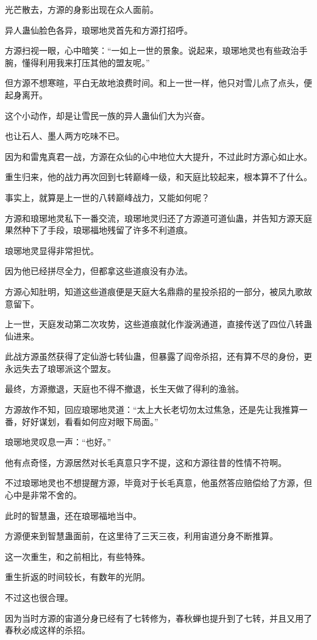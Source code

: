 \begin{this_body}
光芒散去，方源的身影出现在众人面前。

异人蛊仙脸色各异，琅琊地灵首先和方源打招呼。

方源扫视一眼，心中暗笑：“一如上一世的景象。说起来，琅琊地灵也有些政治手腕，懂得利用我来打压其他的盟友呢。”

但方源不想寒暄，平白无故地浪费时间。和上一世一样，他只对雪儿点了点头，便起身离开。

这个小动作，却是让雪民一族的异人蛊仙们大为兴奋。

也让石人、墨人两方吃味不已。

因为和雷鬼真君一战，方源在众仙的心中地位大大提升，不过此时方源心如止水。

重生归来，他的战力再次回到七转巅峰一级，和天庭比较起来，根本算不了什么。

事实上，就算是上一世的八转巅峰战力，又能如何呢？

方源和琅琊地灵私下一番交流，琅琊地灵归还了方源道可道仙蛊，并告知方源天庭果然种下了手段，琅琊福地残留了许多不利道痕。

琅琊地灵显得非常担忧。

因为他已经拼尽全力，但都拿这些道痕没有办法。

方源心知肚明，知道这些道痕便是天庭大名鼎鼎的星投杀招的一部分，被凤九歌故意留下。

上一世，天庭发动第二次攻势，这些道痕就化作漩涡通道，直接传送了四位八转蛊仙进来。

此战方源虽然获得了定仙游七转仙蛊，但暴露了阎帝杀招，还有算不尽的身份，更永远失去了琅琊派这个盟友。

最终，方源撤退，天庭也不得不撤退，长生天做了得利的渔翁。

方源故作不知，回应琅琊地灵道：“太上大长老切勿太过焦急，还是先让我推算一番，好好谋划，看看如何应对眼下局面。”

琅琊地灵叹息一声：“也好。”

他有点奇怪，方源居然对长毛真意只字不提，这和方源往昔的性情不符啊。

不过琅琊地灵也不想提醒方源，毕竟对于长毛真意，他虽然答应赔偿给了方源，但心中是非常不舍的。

此时的智慧蛊，还在琅琊福地当中。

方源便来到智慧蛊面前，在这里待了三天三夜，利用宙道分身不断推算。

这一次重生，和之前相比，有些特殊。

重生折返的时间较长，有数年的光阴。

不过这也很合理。

因为当时方源的宙道分身已经有了七转修为，春秋蝉也提升到了七转，并且又用了春秋必成这样的杀招。


\end{this_body}

